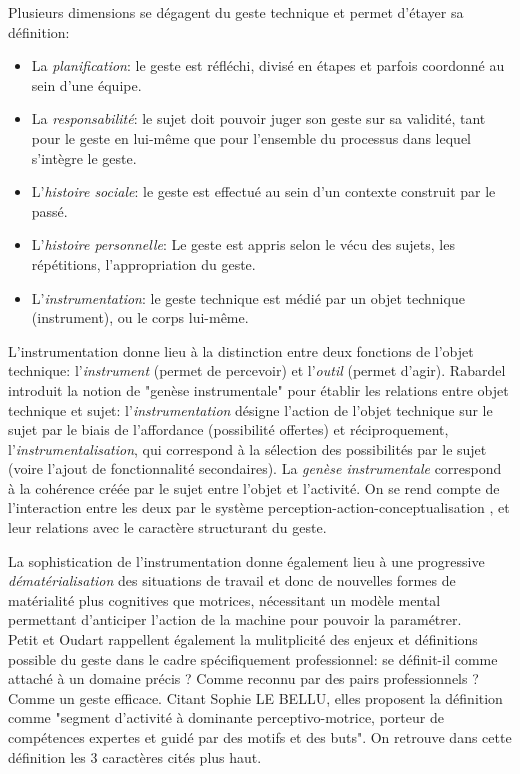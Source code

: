 \documentclass{article}
\begin{document}
Plusieurs dimensions se dégagent du geste technique et permet d'étayer sa 
définition:
\begin{itemize}
    \item La \emph{planification}: le geste est réfléchi, divisé en étapes 
    et parfois coordonné au sein d'une équipe.
    \item La \emph{responsabilité}: le sujet doit pouvoir juger son geste 
    sur sa validité, tant pour le geste en lui-même que pour l'ensemble du 
    processus dans lequel s'intègre le geste.
    \item L'\emph{histoire sociale}: le geste est effectué au sein d'un 
    contexte construit par le passé.
    \item L'\emph{histoire personnelle}: Le geste est appris selon le vécu 
    des sujets, les répétitions, l'appropriation du geste.
    \item L'\emph{instrumentation}: le geste technique est médié par un 
    objet technique (instrument), ou le corps lui-même.
\end{itemize}

L'instrumentation donne lieu à la distinction entre deux fonctions de 
l'objet technique: l'\emph{instrument} (permet de percevoir) et 
l'\emph{outil} (permet d'agir). Rabardel introduit la notion de "genèse 
instrumentale" pour établir les relations entre objet technique et 
sujet: l'\emph{instrumentation} désigne l'action de l'objet technique 
sur le sujet par le biais de l'affordance (possibilité offertes) et 
réciproquement, l'\emph{instrumentalisation}, qui correspond à la sélection 
des possibilités par le sujet (voire l'ajout de fonctionnalité secondaires). 
La \emph{genèse instrumentale} correspond à la cohérence créée par le 
sujet entre l'objet et l'activité.
On se rend compte de l'interaction entre les deux par le système 
perception-action-conceptualisation \cite{mellet-dhuart_faciliter_2005}, 
et leur relations avec le caractère structurant du geste.

La sophistication de l'instrumentation donne également lieu à une progressive 
\emph{dématérialisation} des situations de travail et donc de nouvelles 
formes de matérialité plus cognitives que motrices, nécessitant un modèle 
mental permettant d'anticiper l'action de la machine pour pouvoir la 
paramétrer.
\\

Petit et Oudart \cite{petit_apprendre_2017} rappellent également la 
mulitplicité des enjeux et définitions possible du geste dans le cadre 
spécifiquement professionnel: se définit-il comme attaché à un domaine 
précis ? Comme reconnu par des pairs professionnels ? Comme un geste 
efficace.
Citant Sophie LE BELLU, elles proposent la définition comme "segment 
d'activité à dominante perceptivo-motrice, porteur de compétences expertes 
et guidé par des motifs et des buts". On retrouve dans cette définition 
les 3 caractères cités plus haut.
\end{document}
